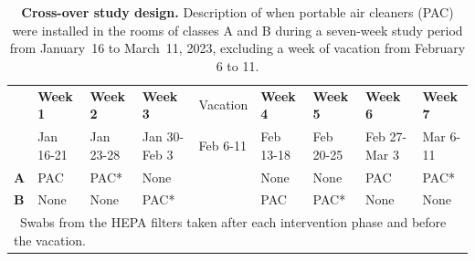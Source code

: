 \documentclass[fleqn,11pt]{wlscirep}
\begin{document}
\begin{table}[!htpb]
    \footnotesize
    \centering
    \caption{\textbf{Cross-over study design.} Description of when portable air cleaners (PAC) were installed in the rooms of classes A and B during a seven-week study period from January~16 to March~11, 2023, excluding a week of vacation from February 6 to 11.}\label{tab:study_design}
    \begin{tabular}{l l l l l l l l l}
    \toprule
      & \textbf{Week 1} & \textbf{Week 2} & \textbf{Week 3} & Vacation & \textbf{Week 4} & \textbf{Week 5} & \textbf{Week 6} & \textbf{Week 7} \\
      & Jan 16-21 & Jan 23-28 & Jan 30-Feb 3 & Feb 6-11 & Feb 13-18 & Feb 20-25 & Feb 27-Mar 3 & Mar 6-11 \\
      \midrule
      \textbf{A} & \cellcolor{gray!50} PAC & \cellcolor{gray!50} PAC\hphantom{000}*& \cellcolor{gray!10} None & & \cellcolor{gray!10} None & \cellcolor{gray!10} None & \cellcolor{gray!50} PAC & \cellcolor{gray!50} PAC\hphantom{0000}* \\
      \textbf{B} & \cellcolor{gray!10} None & \cellcolor{gray!10} None & \cellcolor{gray!50} PAC\hphantom{00000}* & & \cellcolor{gray!50} PAC & \cellcolor{gray!50} PAC\hphantom{000}*& \cellcolor{gray!10} None & \cellcolor{gray!10} None \\
      \bottomrule
      \multicolumn{9}{l}{\scriptsize *~Swabs from the HEPA filters taken after each intervention phase and before the vacation.}
    \end{tabular}
\end{table}

\clearpage
\end{document}
